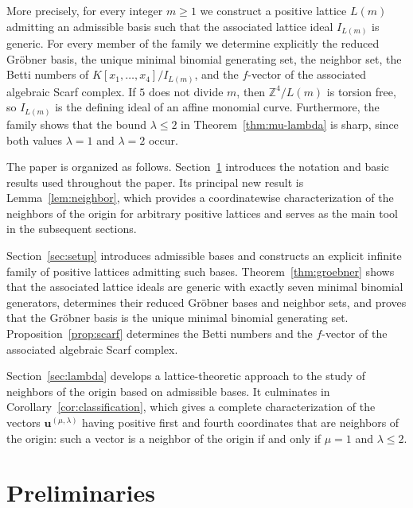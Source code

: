 \documentclass[12pt,a4paper]{amsart}
\theoremstyle{definition}
\begin{document}
More precisely, for every integer $m\ge1$ we construct a positive
lattice $L(m)$ admitting an admissible basis such that the associated
lattice ideal $I_{L(m)}$ is generic.
For every member of the family we determine explicitly the reduced
Gr\"obner basis, the unique minimal binomial generating set, the
neighbor set, the Betti numbers of $K[x_1,\ldots,x_4]/I_{L(m)}$,
and the $f$-vector of the associated algebraic Scarf complex.
If $5$ does not divide $m$, then $\mathbb Z^4/L(m)$ is torsion free, so
$I_{L(m)}$ is the defining ideal of an affine monomial curve.
Furthermore, the family shows that the bound $\lambda\le2$ in
Theorem~\ref{thm:mu-lambda} is sharp, since both values
$\lambda=1$ and $\lambda=2$ occur.

The paper is organized as follows.
Section~\ref{sec:preliminaries} introduces the notation and basic
results used throughout the paper. Its principal new result is
Lemma~\ref{lem:neighbor}, which provides a coordinatewise
characterization of the neighbors of the origin for arbitrary positive
lattices and serves as the main tool in the subsequent sections.

Section~\ref{sec:setup} introduces admissible bases and constructs an
explicit infinite family of positive lattices admitting such bases.
Theorem~\ref{thm:groebner} shows that the associated lattice ideals are
generic with exactly seven minimal binomial generators, determines
their reduced Gr\"obner bases and neighbor sets, and proves that the
Gr\"obner basis is the unique minimal binomial generating set.
Proposition~\ref{prop:scarf} determines the Betti numbers and the
$f$-vector of the associated algebraic Scarf complex.

Section~\ref{sec:lambda} develops a lattice-theoretic approach to the
study of neighbors of the origin based on admissible bases. It
culminates in Corollary~\ref{cor:classification}, which gives a
complete characterization of the vectors
$\mathbf u^{(\mu,\lambda)}$ having positive first and fourth
coordinates that are neighbors of the origin: such a vector is a
neighbor of the origin if and only if $\mu=1$ and $\lambda\le2$.




\section{Preliminaries}
\label{sec:preliminaries}
\end{document}
